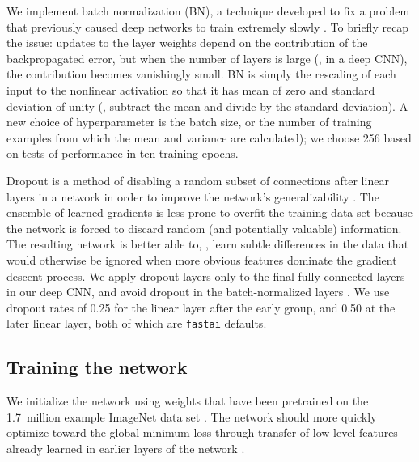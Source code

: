 \documentclass[fleqn,usenatbib]{mnras}
\begin{document}
We implement batch normalization (BN), a technique developed to fix a problem that previously caused deep networks to train extremely slowly \citep{batchnorm}. To briefly recap the issue: updates to the layer weights depend on the contribution of the backpropagated error, but when the number of layers is large (\ie, in a deep CNN), the contribution becomes vanishingly small. BN is simply the rescaling of each input to the nonlinear activation so that it has mean of zero and standard deviation of unity (\ie, subtract the mean and divide by the standard deviation). A new choice of hyperparameter is the batch size, or the number of training examples from which the mean and variance are calculated); we choose 256 based on tests of performance in ten training epochs.

Dropout is a method of disabling a random subset of connections after linear layers in a network in order to improve the network's generalizability \citep{dropout}. The ensemble of learned gradients is less prone to overfit the training data set because the network is forced to discard random (and potentially valuable) information. The resulting network is better able to, \eg, learn subtle differences in the data that would otherwise be ignored when more obvious features dominate the gradient descent process. We apply dropout layers only to the final fully connected layers in our deep CNN, and avoid dropout in the batch-normalized layers \citep[as recommended by][]{batchnorm}. We use dropout rates of 0.25 for the linear layer after the early group, and 0.50 at the later linear layer, both of which are \texttt{fastai} defaults.

\subsection{Training the network}
We initialize the network using weights that have been pretrained on the 1.7~million example ImageNet data set \citep[which contains 1000 classes of objects;][]{ImageNet}. The network should more quickly optimize toward the global minimum loss through transfer of low-level features already learned in earlier layers of the network \citep[known as transfer learning; see, \eg,][]{Pan2010}.
\end{document}
